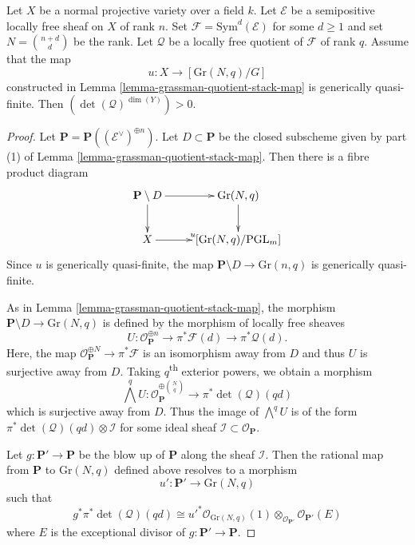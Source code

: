 \begin{lemma}
\label{lemma-positive-self-intersection}
Let $X$ be a normal projective variety over a field $k$.
Let $\mathcal{E}$ be a semipositive locally free sheaf on $X$ of rank $n$.
Set $\mathcal{F} = \mathrm{Sym}^d(\mathcal{E})$ for some $d \geq 1$ and set
$N = \binom{n + d}{d}$ be the rank.
Let $\mathcal{Q}$ be a locally free quotient of $\mathcal{F}$ of rank $q$.
Assume that the map
$$
  u : X \to [\mathrm{Gr}(N,q)/G]
$$
constructed in Lemma \ref{lemma-grassman-quotient-stack-map}
is generically quasi-finite.
Then $(\det(\mathcal{Q})^{\dim(Y)}) > 0$.
\end{lemma}

\begin{proof}
Let $\mathbf{P} = \mathbf{P}((\mathcal{E}^\vee)^{\oplus n})$.
Let $D \subset \mathbf{P}$ be the closed subscheme given by part (1) of
Lemma \ref{lemma-grassman-quotient-stack-map}.
Then there is a fibre product diagram
$$
\xymatrix{
  \mathbf{P} \setminus D \ar[r] \ar[d] & \mathrm{Gr}(N,q) \ar[d] \\
  X \ar[r]^u & [\mathrm{Gr}(N,q)/\mathrm{PGL}_m]
}
$$
Since $u$ is generically quasi-finite, the map
$\mathbf{P} \setminus D \to \mathrm{Gr}(n,q)$ is generically quasi-finite.

As in Lemma \ref{lemma-grassman-quotient-stack-map},
the morphism $\mathbf{P} \setminus D \to \mathrm{Gr}(N,q)$ is defined by
the morphism of locally free sheaves
$$
  U : \mathcal{O}_{\mathbf{P}}^{\oplus n} \to \pi^*\mathcal{F}(d)
                                          \to \pi^*\mathcal{Q}(d).
$$
Here, the map $\mathcal{O}_{\mathbf{P}}^{\oplus N} \to \pi^*\mathcal{F}$ is
an isomorphism away from $D$ and thus $U$ is surjective away from $D$.
Taking $q$\textsuperscript{th} exterior powers, we obtain a morphism
$$
  \bigwedge^q U : \mathcal{O}_{\mathbf{P}}^{\oplus \binom{N}{q}} \to
    \pi^*\det(\mathcal{Q})(qd)
$$
which is surjective away from $D$.
Thus the image of $\bigwedge^q U$ is of the form
$\pi^*\det(\mathcal{Q})(qd) \otimes \mathcal{I}$ for some ideal sheaf
$\mathcal{I} \subset \mathcal{O}_{\mathbf{P}}$.

Let $g : \mathbf{P}' \to \mathbf{P}$ be the blow up of $\mathbf{P}$ along the
sheaf $\mathcal{I}$.
Then the rational map from $\mathbf{P}$ to $\mathrm{Gr}(N,q)$ defined above
resolves to a morphism
$$
  u' : \mathbf{P}' \to \mathrm{Gr}(N,q)
$$
such that
$$
  g^*\pi^*\det(\mathcal{Q})(qd) \cong
    u'^*\mathcal{O}_{\mathrm{Gr}(N,q)}(1)
      \otimes_{\mathcal{O}_{\mathbf{P}'}}
    \mathcal{O}_{\mathbf{P}'}(E)
$$
where $E$ is the exceptional divisor of $g : \mathbf{P}' \to \mathbf{P}$.


\end{proof}
